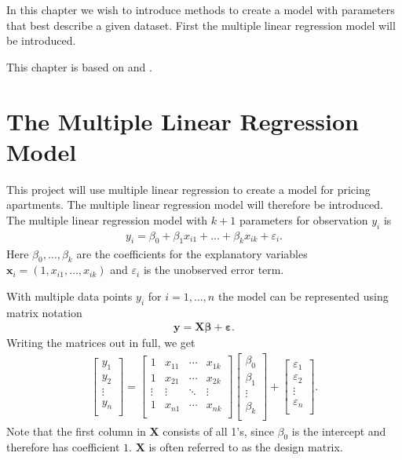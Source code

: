 
In this chapter we wish to introduce methods to create a model with parameters that best describe a given dataset.
First the multiple linear regression model will be introduced.

This chapter is based on \cite{MadsenThyregod2011} and \cite{Wooldridge2012}.

\section{The Multiple Linear Regression Model}
This project will use multiple linear regression to create a model for pricing apartments. The multiple linear regression model will therefore be introduced. The multiple linear regression model with $k+1$ parameters for observation $y_i$ is
\begin{align}\label{eq:multiple_linear_regression}
  y_i = \beta_0 + \beta_1 x_{i1} + \ldots + \beta_k x_{ik} + \varepsilon_i.
\end{align}
Here $\beta_0, \ldots, \beta_k$ are the coefficients for the explanatory variables $\textbf{x}_i = (1, x_{i1}, \ldots, x_{ik})$ and $\varepsilon_i$ is the unobserved error term.

With multiple data points $y_i$ for $i = 1, \ldots, n$ the model can be represented using matrix notation
\begin{align}\label{eq:multiple_linear_regression_model}
    \mathbf{y} = \mathbf{X} \boldsymbol{\beta} + \boldsymbol{\varepsilon}.
\end{align}
Writing the matrices out in full, we get
\begin{align}
  \begin{bmatrix}
    y_1 \\ y_2 \\ \vdots \\ y_n \\
  \end{bmatrix}
  =
  \begin{bmatrix}
    1 & x_{11} & \cdots & x_{1k} \\
    1 & x_{21} & \cdots & x_{2k} \\ \vdots & \vdots & \ddots & \vdots \\ 1 & x_{n1} & \cdots & x_{nk} \\
  \end{bmatrix}
  \begin{bmatrix}
    \beta_0 \\ \beta_1 \\ \vdots \\ \beta_k \\
  \end{bmatrix} +
  \begin{bmatrix}
    \varepsilon_1 \\ \varepsilon_2 \\ \vdots \\ \varepsilon_n \\
  \end{bmatrix}.
\end{align}
Note that the first column in $\mathbf{X}$ consists of all 1's, since $\beta_{0}$ is the intercept and therefore has coefficient $1$. $\textbf{X}$ is often referred to as the design matrix. 

